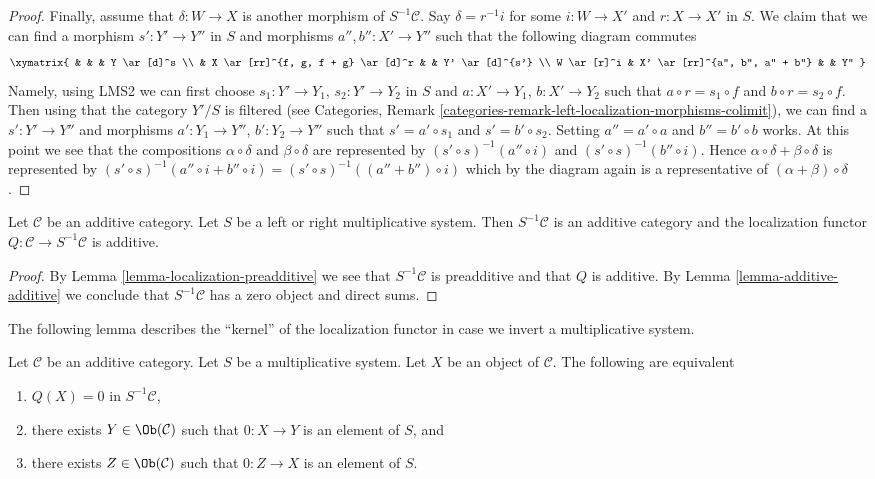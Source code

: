 \begin{proof}
\medskip\noindent
Finally, assume that $\delta : W \to X$ is another morphism of
$S^{-1}\mathcal{C}$. Say $\delta = r^{-1}i$ for some
$i : W \to X'$ and $r : X \to X'$ in $S$. We claim that we can find
a morphism $s' : Y' \to Y''$ in $S$ and morphisms $a'', b'' : X' \to Y''$
such that the following diagram commutes
$$
\xymatrix{
& & & Y \ar[d]^s \\
& X \ar[rr]^{f, g, f + g} \ar[d]^r & & Y' \ar[d]^{s'} \\
W \ar[r]^i & X' \ar[rr]^{a'', b'', a'' + b''} & & Y''
}
$$
Namely, using LMS2 we can first choose
$s_1 : Y' \to Y_1$, $s_2 : Y' \to Y_2$ in $S$ and
$a : X' \to Y_1$, $b : X' \to Y_2$ such that
$a \circ r = s_1 \circ f$ and $b \circ r = s_2 \circ f$.
Then using that the category $Y'/S$ is filtered (see
Categories, Remark \ref{categories-remark-left-localization-morphisms-colimit}),
we can
find a $s' : Y' \to Y''$ and morphisms $a' : Y_1 \to Y''$, $b' : Y_2 \to Y''$
such that $s' = a' \circ s_1$ and $s' = b' \circ s_2$. Setting
$a'' = a' \circ a$ and $b'' = b' \circ b$ works.
At this point we see that the compositions
$\alpha \circ \delta$ and $\beta \circ \delta$ are represented by
$(s' \circ s)^{-1}(a'' \circ i)$ and $(s' \circ s)^{-1}(b'' \circ i)$.
Hence $\alpha \circ \delta + \beta \circ \delta$ is represented
by $(s' \circ s)^{-1}(a'' \circ i + b'' \circ i) =
(s' \circ s)^{-1}((a'' + b'') \circ i)$
which by the diagram again is a representative
of $(\alpha + \beta) \circ \delta$.
\end{proof}

\begin{lemma}
\label{lemma-localization-additive}
Let $\mathcal{C}$ be an additive category.
Let $S$ be a left or right multiplicative system.
Then $S^{-1}\mathcal{C}$ is an additive category and the localization functor
$Q : \mathcal{C} \to S^{-1}\mathcal{C}$ is additive.
\end{lemma}

\begin{proof}
By Lemma \ref{lemma-localization-preadditive}
we see that $S^{-1}\mathcal{C}$ is preadditive and that $Q$ is additive.
By Lemma \ref{lemma-additive-additive} we conclude that $S^{-1}\mathcal{C}$
has a zero object and direct sums.
\end{proof}

\noindent
The following lemma describes the ``kernel''
of the localization functor in case we invert a multiplicative system.

\begin{lemma}
\label{lemma-kernel-localization}
Let $\mathcal{C}$ be an additive category. Let $S$ be a multiplicative
system. Let $X$ be an object
of $\mathcal{C}$. The following are equivalent
\begin{enumerate}
\item $Q(X) = 0$ in $S^{-1}\mathcal{C}$,
\item there exists $Y \in \Ob(\mathcal{C})$ such that
$0 : X \to Y$ is an element of $S$, and
\item there exists $Z \in \Ob(\mathcal{C})$ such that
$0 : Z \to X$ is an element of $S$.
\end{enumerate}
\end{lemma}

